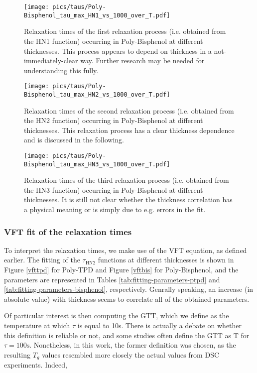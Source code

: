 \begin{figure}[t]%
  \centering
  \texttt{[image: pics/taus/Poly-Bisphenol\_tau\_max\_HN1\_vs\_1000\_over\_T.pdf]}
  \caption{Relaxation times of the first relaxation process (i.e. obtained from the HN1 function) occurring in Poly-Bisphenol at different thicknesses. This process appears to depend on thickness in a not-immediately-clear way. Further research may be needed for understanding this fully.}
  \label{bishn1}
\end{figure}%

\begin{figure}[t]%
  \centering
  \texttt{[image: pics/taus/Poly-Bisphenol\_tau\_max\_HN2\_vs\_1000\_over\_T.pdf]}
  \caption{Relaxation times of the second relaxation process (i.e. obtained from the HN2 function) occurring in Poly-Bisphenol at different thicknesses. This relaxation process has a clear thickness dependence and is discussed in the following.}
  \label{bishn2}
\end{figure}%

\begin{figure}[t]%
  \centering
  \texttt{[image: pics/taus/Poly-Bisphenol\_tau\_max\_HN3\_vs\_1000\_over\_T.pdf]}
  \caption{Relaxation times of the third relaxation process (i.e. obtained from the HN3 function) occurring in Poly-Bisphenol at different thicknesses. It is still not clear whether the thickness correlation has a physical meaning or is simply due to e.g. errors in the fit.}
  \label{bishn3}
\end{figure}%

\subsubsection{VFT fit of the relaxation times}
To interpret the relaxation times, we make use of the \ac{VFT} equation, as defined earlier. The fitting of the $\tau_{\text{HN2}}$ functions at different thicknesses is shown in Figure \ref{vfttpd} for Poly-TPD and Figure \ref{vftbis} for Poly-Bisphenol, and the parameters are represented in Tables \ref{tab:fitting-parameters-ptpd} and \ref{tab:fitting-parameters-bisphenol}, respectively.
Genrally speaking, an increase (in absolute value) with thickness seems to correlate all of the obtained parameters.

Of particular interest is then computing the GTT, which we define as the temperature at which $\tau$ is equal to 10s.  There is actually a debate on whether this definition is reliable or not, and some studies often define the GTT as T for $\tau = \text{100s}$. Nonetheless, in this work, the former definition was chosen, as the resulting $T_g$ values resembled more closely the actual values from \ac{DSC} experiments. %
Indeed, %

